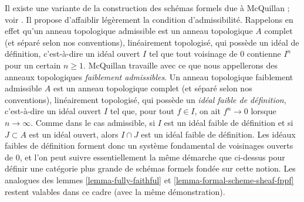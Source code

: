 \begin{remark}
\label{remark-mcquillan}
Il existe une variante de la construction des schémas formels due à
McQuillan ; voir \cite{McQuillan}.
Il propose d'affaiblir légèrement la condition d'admissibilité.
Rappelons en effet qu'un anneau topologique admissible est un anneau topologique $A$
complet (et séparé selon nos conventions),
linéairement topologisé, qui possède un
idéal de définition, c'est-à-dire un
idéal ouvert $I$ tel que tout voisinage de $0$ contienne $I^n$
pour un certain $n \geq 1$.
McQuillan travaille avec ce que nous appellerons des anneaux topologiques
{\it faiblement admissibles}. Un anneau topologique faiblement admissible $A$ est un anneau topologique
complet (et séparé selon nos conventions),
linéairement topologisé, qui possède un
{\it idéal faible de définition}, c'est-à-dire un idéal ouvert $I$ tel que,
pour tout $f \in I$, on ait
$f^n \to 0$ lorsque $n \to \infty$. Comme dans le cas admissible,
si $I$ est un idéal faible de définition et si $J \subset A$ est un
idéal ouvert, alors $I \cap J$ est un idéal faible de définition.
Les idéaux faibles de définition forment donc un système fondamental de
voisinages ouverts de $0$, et
l'on peut suivre essentiellement la même démarche que ci-dessus
pour définir une catégorie plus grande de schémas formels fondée
sur cette notion. Les analogues des lemmes \ref{lemma-fully-faithful} et
\ref{lemma-formal-scheme-sheaf-fppf}
restent valables dans ce cadre (avec la même démonstration).
\end{remark}

